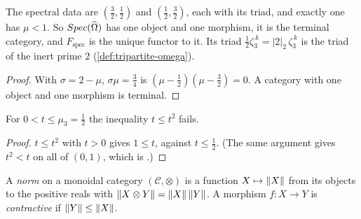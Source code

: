 \begin{proposition}\label{prop:spectral-data}
The spectral data are $(\tfrac32,\tfrac12)$ and $(\tfrac12,\tfrac32)$, each with its triad, and exactly one has
$\mu<1$.  So $Spec(\widehat{\Omega})$ has one object and one morphism, it is the terminal category, and
$F_{\mathrm{spec}}$ is the unique functor to it.  Its triad $\tfrac12\zeta_3^{\,k}=|2|_2\,\zeta_3^{\,k}$ is the triad
of the inert prime $2$ (\cref{def:tripartite-omega}).
\end{proposition}
\begin{proof}
With $\sigma=2-\mu$, $\sigma\mu=\tfrac34$ is $(\mu-\tfrac12)(\mu-\tfrac32)=0$.  A category with one object and one
morphism is terminal.
\end{proof}

\begin{lemma}\label{lem:diagonal-contraction}
For $0<t\le\mu_3=\tfrac12$ the inequality $t\le t^2$ fails.
\end{lemma}

\begin{proof}
$t\le t^2$ with $t>0$ gives $1\le t$, against $t\le\tfrac12$.  (The same argument
gives $t^2<t$ on all of $(0,1)$, which is .)
\end{proof}

\begin{definition}\label{def:normed-monoidal}
A \emph{norm} on a monoidal category $(\mathcal C,\otimes)$ is a function $X\mapsto\|X\|$ from its objects to
the positive reals with $\|X\otimes Y\|=\|X\|\,\|Y\|$.  A morphism $f\colon X\to Y$ is \emph{contractive} if
$\|Y\|\le\|X\|$.
\end{definition}

